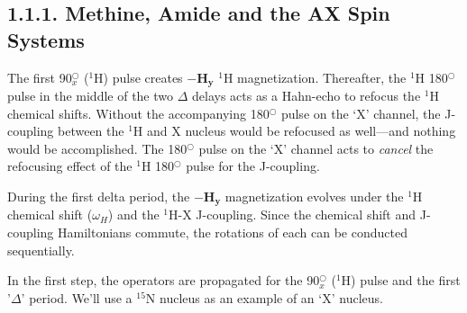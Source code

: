 \documentclass{tufte-book}
\begin{document}
\subsection{1.1.1. Methine, Amide and the AX Spin Systems} \label{subsec:fundamental-solnnmr-inept-inept-dm-methine-amide-and-the-ax-spin-systems}
The first 90\ensuremath{^{○}_{x}} (\ensuremath{^{1}}H) pulse creates \ensuremath{\boldsymbol{-H_y}} \ensuremath{^{1}}H magnetization.
  Thereafter, the \ensuremath{^{1}}H 180\ensuremath{^{○}} pulse in the middle of the two
\ensuremath{\Delta} delays acts as a Hahn-echo to refocus the \ensuremath{^{1}}H chemical
shifts. Without the accompanying 180\ensuremath{^{○}} pulse on the ‘X’ channel, the
J-coupling between the \ensuremath{^{1}}H and X nucleus would be refocused as
well—and nothing would be accomplished. The 180\ensuremath{^{○}} pulse on the ‘X’
channel acts to \textit{cancel} the refocusing effect of the \ensuremath{^{1}}H 180\ensuremath{^{○}}
pulse for the J-coupling.

During the first delta period, the \ensuremath{\boldsymbol{- H_y}} magnetization evolves
under the \ensuremath{^{1}}H chemical shift (\ensuremath{\omega}\ensuremath{_{H}}) and the \ensuremath{^{1}}H-X
J-coupling. Since the chemical shift and J-coupling Hamiltonians
commute, the rotations of each can be conducted sequentially.

In the first step, the operators are propagated for the 90\ensuremath{^{○}_{x}} (\ensuremath{^{1}}H) pulse
and the first '\ensuremath{\Delta}' period. We’ll use a \ensuremath{^{15}}N nucleus as an example
of an ‘X’ nucleus.
\end{document}
